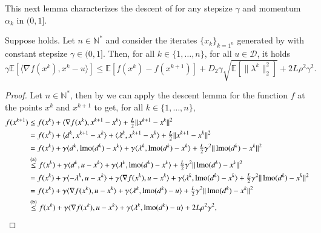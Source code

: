 \begin{toappendix}
This next lemma characterizes the descent of  for any stepsize $\gamma$ and momentum $\alpha_k$ in $(0,1]$.
\begin{lemma}
    \label{lem:commondescent}
    Suppose  holds.
    Let $n\in\mathbb{N}^*$ and consider the iterates $\{x_k\}_{k=1^n}$ generated by  with constant stepsize $\gamma\in(0,1]$.
    Then, for all $k\in\{1,\ldots,n\}$, for all $u\in \mathcal{D}$, it holds
    \begin{equation}
        \gamma \mathbb{E}[\langle \nabla f(x^k), x^k-u\rangle] \leq \mathbb{E}[f(x^k) - f(x^{k+1})] + D_2\gamma \sqrt{\mathbb{E}[\| \lambda^k\|_2^2]} + 2L\rho^2\gamma^2.
    \end{equation}
\end{lemma}
\begin{proof}
    Let $n\in\mathbb{N}^*$, then by  we can apply the descent lemma for the function $f$ at the points $x^k$ and $x^{k+1}$ to get, for all $k\in\{1,\ldots,n\}$,
    \begin{equation*}
        \begin{aligned}
            f(x^{k+1})
                &\leq f(x^k) + \langle \nabla f(x^k), x^{k+1}-x^k\rangle + \tfrac{L}{2}\|x^{k+1}-x^k\|^2\\
                &= f(x^k) + \langle d^k, x^{k+1}-x^k\rangle + \langle \lambda^k, x^{k+1}-x^k\rangle + \tfrac{L}{2}\|x^{k+1}-x^k\|^2\\
                &= f(x^k) + \gamma\langle d^k, \lmo(d^k)-x^k\rangle + \gamma \langle \lambda^k, \lmo(d^k)-x^k\rangle + \tfrac{L}{2}\gamma^2\|\lmo(d^k)-x^k\|^2\\
                &\stackrel{\text{(a)}}{\leq} f(x^k) + \gamma\langle d^k, u-x^k\rangle + \gamma \langle \lambda^k, \lmo(d^k)-x^k\rangle + \tfrac{L}{2}\gamma^2\|\lmo(d^k)-x^k\|^2\\
                &= f(x^k) + \gamma\langle -\lambda^k, u-x^k\rangle + \gamma \langle \nabla f(x^k), u-x^k\rangle + \gamma \langle \lambda^k, \lmo(d^k)-x^k\rangle + \tfrac{L}{2}\gamma^2\|\lmo(d^k)-x^k\|^2\\
                &= f(x^k) + \gamma \langle \nabla f(x^k), u-x^k\rangle + \gamma \langle \lambda^k, \lmo(d^k)-u\rangle + \tfrac{L}{2}\gamma^2\|\lmo(d^k)-x^k\|^2\\
                &\stackrel{\text{(b)}}{\leq} f(x^k) + \gamma \langle \nabla f(x^k), u-x^k\rangle + \gamma \langle \lambda^k, \lmo(d^k)-u\rangle + 2L\rho^2\gamma^2,
        \end{aligned}

\end{equation*}
\end{proof}
\end{toappendix}

